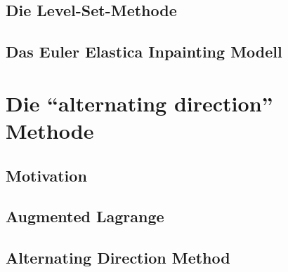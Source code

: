 \documentclass{mythesis}
\begin{document}
\section{Die Level-Set-Methode}
%

\section{Das Euler Elastica Inpainting Modell} %



\chapter{Die “alternating direction” Methode}


\section{Motivation} %

\section{Augmented Lagrange}

\section{Alternating Direction Method}
\end{document}
